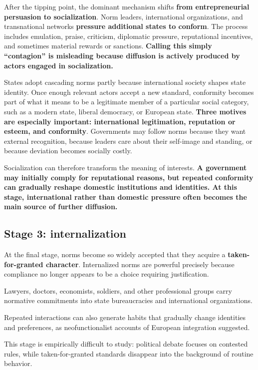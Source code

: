 After the tipping point, the dominant mechanism shifts \textbf{from entrepreneurial persuasion to socialization}. Norm leaders, international organizations, and transnational networks \textbf{pressure additional states to conform}. The process includes emulation, praise, criticism, diplomatic pressure, reputational incentives, and sometimes material rewards or sanctions. \textbf{Calling this simply ``contagion'' is misleading because diffusion is actively produced by actors engaged in socialization.}

States adopt cascading norms partly because international society shapes state identity. Once enough relevant actors accept a new standard, conformity becomes part of what it means to be a legitimate member of a particular social category, such as a modern state, liberal democracy, or European state. \textbf{Three motives are especially important: international legitimation, reputation or esteem, and conformity}. Governments may follow norms because they want external recognition, because leaders care about their self-image and standing, or because deviation becomes socially costly.

Socialization can therefore transform the meaning of interests. \textbf{A government may initially comply for reputational reasons, but repeated conformity can gradually reshape domestic institutions and identities. At this stage, international rather than domestic pressure often becomes the main source of further diffusion.}

\subsection{Stage 3: internalization}

At the final stage, norms become so widely accepted that they acquire a \textbf{taken-for-granted character}. Internalized norms are powerful precisely because compliance no longer appears to be a choice requiring justification.

Lawyers, doctors, economists, soldiers, and other professional groups carry normative commitments into state bureaucracies and international organizations.

Repeated interactions can also generate habits that gradually change identities and preferences, as neofunctionalist accounts of European integration suggested.

This stage is empirically difficult to study: political debate focuses on contested rules, while taken-for-granted standards disappear into the background of routine behavior.


